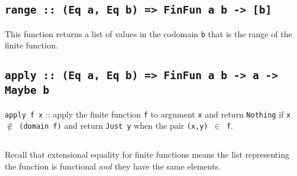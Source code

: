 \documentclass[11pt]{article}
\begin{document}
\subsection{\tt{range :: (Eq a, Eq b) => FinFun a b -> [b]}}
This function returns a list of values in the codomain {\tt{b}} that
is the range of the finite function.

\subsection{\tt{{apply :: (Eq a, Eq b) => FinFun a b -> a -> Maybe b}}}
{\tt{apply f x}} :: apply the finite function {\tt{f}} to argument {\tt{x}} and return
{\tt{Nothing}} if {\tt{x $\not\in$ (domain f)}} and return {\tt{Just y}} when the pair {\tt{(x,y) $\in$ f}}.



\subsection{}
Recall that extensional equality for finite functions means the list
representing the function is functional {\em{and}} they have the same
elements.
\end{document}
